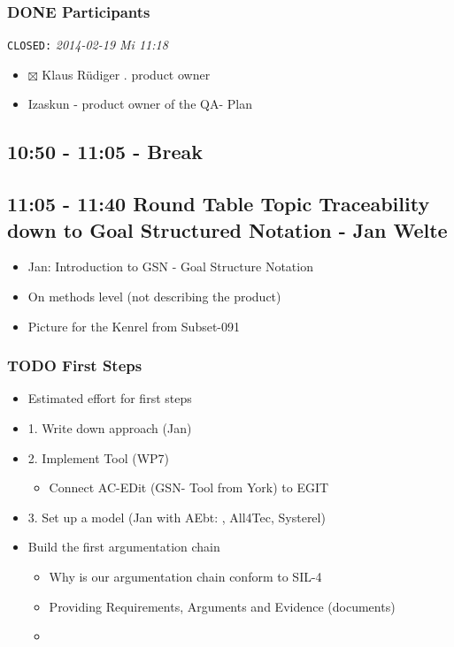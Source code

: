 \documentclass[a4paper,german]{article}
\begin{document}
\subsubsection{\textbf{DONE} Participants}
\label{sec-1-3-3}

      \texttt{CLOSED:} \textit{2014-02-19 Mi 11:18}

\begin{itemize}
\item $\boxtimes$ Klaus Rüdiger . product owner
\item Izaskun - product owner of the QA- Plan
\end{itemize}
\subsection{10:50 - 11:05 - Break}
\label{sec-1-4}
\subsection{11:05 - 11:40 Round Table Topic Traceability down to Goal Structured Notation - Jan Welte}
\label{sec-1-5}

\begin{itemize}
\item Jan: Introduction to GSN - Goal Structure Notation
\item On methods level (not describing the product)
\item Picture for the Kenrel from Subset-091
\end{itemize}
\subsubsection{\textbf{TODO} First Steps}
\label{sec-1-5-1}

\begin{itemize}
\item Estimated effort for first steps
\item 1. Write down approach (Jan)
\item 2. Implement Tool (WP7)
\begin{itemize}
\item Connect AC-EDit (GSN- Tool from York) to EGIT
\end{itemize}
\item 3. Set up a model (Jan with AEbt: , All4Tec, Systerel)
\item Build the first argumentation chain
\begin{itemize}
\item Why is our argumentation chain conform to SIL-4
\item Providing Requirements, Arguments and Evidence (documents)
\item 
\end{itemize}
\end{itemize}
\end{document}
